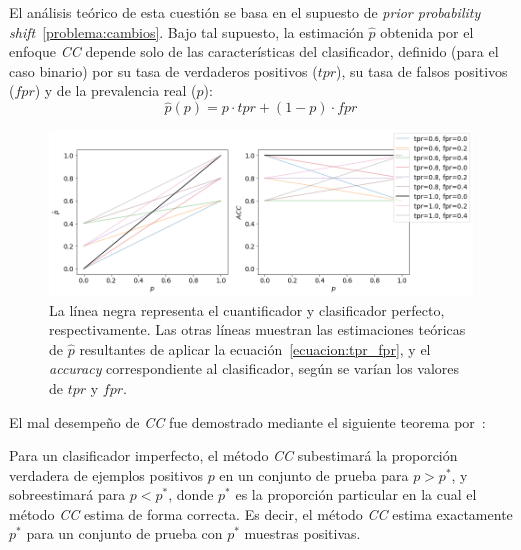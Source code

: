 El análisis teórico de esta cuestión se basa en el supuesto de {\it prior
probability shift\/}~\ref{problema:cambios}. Bajo tal supuesto, la estimación
$\hat p$ obtenida por el enfoque {\it CC\/} depende solo de las características
del clasificador, definido (para el caso binario) por su tasa de verdaderos
positivos ($tpr$), su tasa de falsos positivos ($fpr$) y de la prevalencia real
($p$):
\begin{equation}\label{ecuacion:tpr_fpr}
    \hat p(p) = p \cdot {tpr} + (1-p) \cdot {fpr}
\end{equation}
\begin{figure}[!h]
    \includegraphics[width=\textwidth]{../plots_teoria/cc_tpr_fpr.png}
    \caption{La línea negra representa el cuantificador y clasificador perfecto,
    respectivamente. Las otras líneas muestran las estimaciones teóricas de
    $\hat p$ resultantes de aplicar la ecuación~\ref{ecuacion:tpr_fpr}, y el
    {\it accuracy\/} correspondiente al clasificador, según se varían los
    valores de $tpr$ y $fpr$.}\label{fig:cc_tpr_fpr}
\end{figure}

El mal desempeño de {\it CC\/} fue demostrado mediante el siguiente teorema
por~\citet{forman2008quantifying}:

\begin{theorem}
    \citep[p.169]{forman2008quantifying}\label{teorema:forman} Para un
    clasificador imperfecto, el método {\it CC\/} subestimará la proporción
    verdadera de ejemplos positivos $p$ en un conjunto de prueba para $p>p^*$, y
    sobreestimará para $p<p^*$, donde $p^*$ es la proporción particular en la
    cual el método {\it CC\/} estima de forma correcta. Es decir, el método {\it
    CC\/} estima exactamente $p^*$ para un conjunto de prueba con $p^*$ muestras
    positivas.
\end{theorem}


